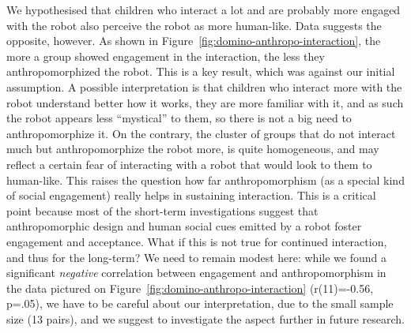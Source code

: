 \documentclass{sig-alternate}
\begin{document}
We hypothesised that children who interact a lot and are probably more engaged
with the robot also perceive the robot as more human-like. Data suggests the
opposite, however. As shown in Figure~\ref{fig:domino-anthropo-interaction}, 
the more a group showed engagement in the interaction, the less they
anthropomorphized the robot. This is a key result, which was against our
initial assumption. A possible interpretation is that children who interact more
with the robot understand better how it works, they are more familiar with it,
and as such the robot appears less ``mystical'' to them, so there is not a big
need to anthropomorphize it. On the contrary, the cluster of groups that do not
interact much but anthropomorphize the robot more, is quite homogeneous, and may
reflect a certain fear of interacting with a robot that would look to them to
human-like.
This raises the question how far anthropomorphism (as a special kind of social
engagement) really helps in sustaining interaction. This is a critical point
because most of the short-term investigations suggest that anthropomorphic
design and human social cues emitted by a robot foster engagement and
acceptance. What if this is not true for continued interaction, and thus for the
long-term? We need to remain modest here: while we found a significant
\emph{negative} correlation between engagement and anthropomorphism in the data
pictured on Figure~\ref{fig:domino-anthropo-interaction} (r(11)=-0.56, p=.05),
we have to be careful about our interpretation, due to the small sample size (13
pairs), and we suggest to investigate the aspect further in future research.
\end{document}
